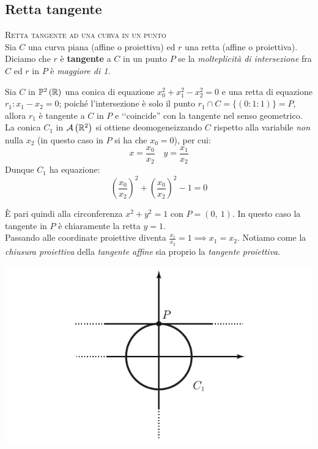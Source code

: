 \subsection{Retta tangente}
\begin{define}\textsc{Retta tangente ad una curva in un punto}\\
Sia $C$ una curva piana (affine o proiettiva) ed $r$ una retta (affine o proiettiva). Diciamo che $r$ è \textbf{tangente}  a $C$ in un punto $P$ se la \textit{molteplicità di intersezione} fra $C$ ed $r$ in $P$ è \textit{maggiore di 1}.
\end{define}
\begin{example}	Sia $C$ in $\proj[2]{\realset}$ una conica di equazione $x_0^2+x_1^2-x_2^2=0$ e una retta di equazione $r_1\colon x_1-x_2=0$; poiché l'intersezione è solo il punto $r_1\cap C=\{(0\colon 1\colon 1)\}=P$, allora $r_1$ è tangente a $C$ in $P$ e ‘‘coincide'' con la tangente nel senso geometrico.\\
La conica $C_1$ in ${\mathcal{A}\left(\mathbb{R}^2\right)}$ si ottiene deomogeneizzando $C$ rispetto alla variabile \textit{non} nulla $x_2$ (in questo caso in $P$ si ha che $x_0=0$), per cui:
\begin{equation*}
		x=\frac{x_0}{x_2}\quad y=\frac{x_1}{x_2}
	\end{equation*}
	Dunque $C_1$ ha equazione:
	\begin{equation*}
		\left( \frac{x_0}{x_2} \right)^2 + \left( \frac{x_0}{x_2} \right)^2 -1 =0
	\end{equation*}
\begin{minipage}{0.75\textwidth}
È pari quindi alla circonferenza $x^2+y^2=1$ con $P=(0,\ 1)$. In questo caso la tangente in $P$ è chiaramente la retta $y=1$.\\
Passando alle coordinate proiettive diventa $\frac{x_1}{x_2}=1 \implies x_1=x_2$. Notiamo come la \textit{chiusura proiettiva} della \textit{tangente affine} sia proprio la \textit{tangente proiettiva}.
\end{minipage}
\hspace{-12mm}
\begin{minipage}{0.24\textwidth}
	\includegraphics[trim=0cm 0cm 0cm 0cm,clip,scale=0.50]{images/planecurve1.pdf}
\end{minipage}
\end{example}
